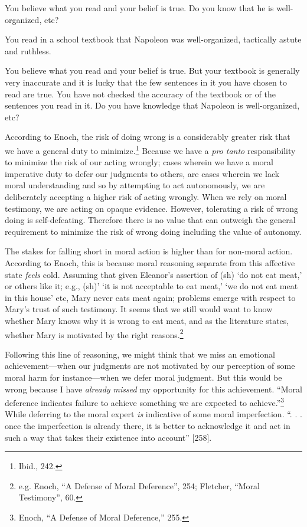 \documentclass[phdthesis,12pt,final]{wuthesis}
\theoremstyle{definition}
\theoremstyle{definition}
\theoremstyle{definition}
\theoremstyle{definition}
\theoremstyle{remark}
\begin{document}
You believe what you read and your belief is true. Do you know that he is well-organized, etc?

You read in a school textbook that Napoleon was well-organized, tactically astute and ruthless.

You believe what you read and your belief is true. But your textbook is generally very inaccurate and it is lucky that the few sentences in it you have chosen to read are true. You have not checked the accuracy of the textbook or of the sentences you read in it. Do you have knowledge that Napoleon is well-organized, etc?

According to Enoch, the risk of doing wrong is a considerably greater risk that we have a general duty to minimize.\footnote{Ibid., 242.} Because we have a \emph{pro tanto} responsibility to minimize the risk of our acting wrongly; cases wherein we have a moral imperative duty to defer our judgments to others, are cases wherein we lack moral understanding and so by attempting to act autonomously, we are deliberately accepting a higher risk of acting wrongly. When we rely on moral testimony, we are acting on opaque evidence. However, tolerating a risk of wrong doing is self-defeating. Therefore there is no value that can outweigh the general requirement to minimize the risk of wrong doing including the value of autonomy.

The stakes for falling short in moral action is higher than for non-moral action. According to Enoch, this is because moral reasoning separate from this affective state \emph{feels} cold. Assuming that given Eleanor's assertion of (sh) `do not eat meat,' or others like it; e.g., (sh)' `it is not acceptable to eat meat,' `we do not eat meat in this house' etc, Mary never eats meat again; problems emerge with respect to Mary's trust of such testimony. It seems that we still would want to know whether Mary knows why it is wrong to eat meat, and as the literature states, whether Mary is motivated by the right reasons.\footnote{e.g. Enoch, {``A {Defense} of {Moral Deference}''}, 254; Fletcher, {``Moral {Testimony}''}, 60.}

Following this line of reasoning, we might think that we miss an emotional achievement---when our judgments are not motivated by our perception of some moral harm for instance---when we defer moral judgment. But this would be wrong because I have \emph{already missed} my opportunity for this achievement. ``Moral deference indicates failure to achieve something we are expected to achieve.''\footnote{Enoch, {``A {Defense} of {Moral Deference},''} 255.} While deferring to the moral expert \emph{is} indicative of some moral imperfection. ``. . . once the imperfection is already there, it is better to acknowledge it and act in such a way that takes their existence into account'' {[}258{]}.
\end{document}
